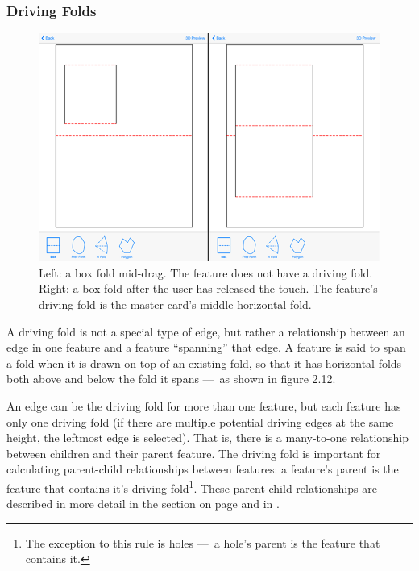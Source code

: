 \subsubsection{Driving Folds}\label{driving-folds}

\begin{figure}[htbp]
\centering
\includegraphics{figures/33_UI_Interface_Data_Structures/boxfold_driving_non_driving.png}
\caption{Left: a box fold mid-drag. The feature does not have a driving
fold. Right: a box-fold after the user has released the touch. The
feature's driving fold is the master card's middle horizontal fold.}
\end{figure}

A driving fold is not a special type of edge, but rather a relationship
between an edge in one feature and a feature ``spanning'' that edge. A
feature is said to span a fold when it is drawn on top of an existing
fold, so that it has horizontal folds both above and below the fold it
spans ---~as shown in figure 2.12.

An edge can be the driving fold for more than one feature, but each
feature has only one driving fold (if there are multiple potential
driving edges at the same height, the leftmost edge is selected). That
is, there is a many-to-one relationship between children and their
parent feature. The driving fold is important for calculating
parent-child relationships between features: a feature's parent is the
feature that contains it's driving fold\footnote{The exception to this
  rule is holes ---~a hole's parent is the feature that contains it.}.
These parent-child relationships are described in more detail in the
section  on page \pageref{hierarchy} and in
\citet{mallen}.

